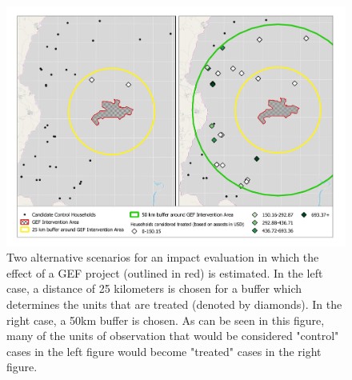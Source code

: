 \documentclass[sustainability,article,submit,moreauthors,pdftex]{Definitions/mdpi}
\begin{document}
\begin{figure}[!ht]
\includegraphics[width=\textwidth]{Figures/final_figure2.pdf}
\caption{Two alternative scenarios for an impact evaluation in which the effect of a GEF project (outlined in red) is estimated.  In the left case, a distance of 25 kilometers is chosen for a buffer which determines the units that are treated (denoted by diamonds).  In the right case, a 50km buffer is chosen.  As can be seen in this figure, many of the units of observation that would be considered "control" cases in the left figure would become "treated" cases in the right figure.}
\label{fig:bands}
\end{figure}
\end{document}
